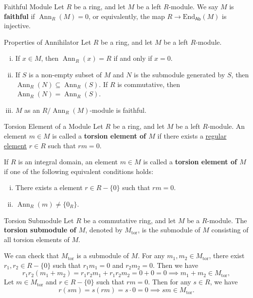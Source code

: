 \begin{definition}{Faithful Module}{}
    Let $R$ be a ring, and let $M$ be a left $R$-module. We say $M$ is \textbf{faithful} if $\operatorname{Ann}_R(M)=0$, or equivalently, the map $R\to \mathrm{End}_{\mathsf{Ab}}(M)$ is injective.
\end{definition}

\begin{proposition}{Properties of Annihilator}{}
    Let $R$ be a ring, and let $M$ be a left $R$-module. 
    \begin{enumerate}[(i)]
        \item If $x\in M$, then $\operatorname{Ann}_R(x)=R$ if and only if $x=0$.
        \item If $S$ is a non-empty subset of $M$ and $N$ is the submodule generated by $S$, then $\operatorname{Ann}_R(N)\subseteq \operatorname{Ann}_R(S)$. If $R$ is commutative, then $\operatorname{Ann}_R(N)= \operatorname{Ann}_R(S)$.
        \item $M$ as an $R/\operatorname{Ann}_R(M)$-module is faithful.
    \end{enumerate}
\end{proposition}



\begin{definition}{Torsion Element of a Module}{}
    Let $R$ be a ring, and let $M$ be a left $R$-module. An element $m\in M$ is called a \textbf{torsion element of $M$} if there exists a \hyperref[th:zero_divisor]{regular element} $r\in R$ such that $rm=0$. 
    
    If $R$ is an integral domain, an element $m\in M$ is called a \textbf{torsion element of $M$} if one of the following equivalent conditions holds:
    \begin{enumerate}[(i)]
        \item There exists a element $r\in R-\{0\}$ such that $rm=0$.
        \item $\operatorname{Ann}_R(m)\neq \{0_R\}$.
    \end{enumerate}
\end{definition}


\begin{definition}{Torsion Submodule}{}
    Let $R$ be a commutative ring, and let $M$ be a $R$-module. The \textbf{torsion submodule of $M$}, denoted by $M_{\mathrm{tor}}$, is the submodule of $M$ consisting of all torsion elements of $M$.
\end{definition}
\begin{prf}
    We can check that $M_{\mathrm{tor}}$ is a submodule of $M$. For any $m_1, m_2\in M_{\mathrm{tor}}$, there exist $r_1, r_2\in R-\{0\}$ such that $r_1m_1=0$ and $r_2m_2=0$. Then we have
    \[
        r_1r_2(m_1+m_2)=r_1r_2m_1+r_1r_2m_2=0+0=0\implies m_1+m_2\in M_{\mathrm{tor}},
    \]
    Let $m\in M_{\mathrm{tor}}$ and $r\in R-\{0\}$ such that $rm=0$. Then for any $s\in R$, we have
    \[
        r(sm)=s(rm)=s\cdot 0=0\implies sm\in M_{\mathrm{tor}}.
    \]
\end{prf}

